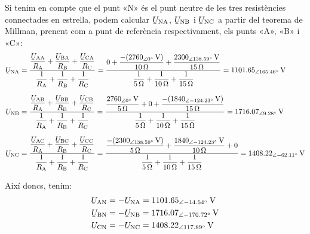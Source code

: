 \begin{exemple}
    Si tenim en compte que el punt «N» és el punt neutre de les tres resistències connectades en estrella, podem calcular $\cmplx{U}\ped{NA} $, $\cmplx{U}\ped{NB} $ i $\cmplx{U}\ped{NC}$ a partir del teorema de Millman, prenent com a punt de referència respectivament, els punts «A»,  «B»  i «C»:
    \begin{align*}
          \cmplx{U}\ped{NA} &= \frac{\dfrac{\cmplx{U}\ped{AA}}{R\ped{A}} + \dfrac{\cmplx{U}\ped{BA}}{R\ped{B}} + \dfrac{\cmplx{U}\ped{CA}}{R\ped{C}}}{\dfrac{1}{R\ped{A}} + \dfrac{1}{R\ped{B}} + \dfrac{1}{R\ped{C}}} = \frac{0 + \dfrac{-(\qtypd{2760}{0}{V})}{\qty{10}{\ohm}} + \dfrac{\qtypd{2300}{138,59}{V}}{\qty{15}{\ohm}}}{\dfrac{1}{\qty{5}{\ohm}} + \dfrac{1}{\qty{10}{\ohm}} + \dfrac{1}{\qty{15}{\ohm}}} = \qtypd{1101,65}{165,46}{V} \\[1.5ex]
          \cmplx{U}\ped{NB} &= \frac{\dfrac{\cmplx{U}\ped{AB}}{R\ped{A}} + \dfrac{\cmplx{U}\ped{BB}}{R\ped{B}} + \dfrac{\cmplx{U}\ped{CB}}{R\ped{C}}}{\dfrac{1}{R\ped{A}} + \dfrac{1}{R\ped{B}} + \dfrac{1}{R\ped{C}}} = \frac{\dfrac{\qtypd{2760}{0}{V}}{\qty{5}{\ohm}} + 0 + \dfrac{-(\qtypd{1840}{-124,23}{V})}{\qty{15}{\ohm}}}{\dfrac{1}{\qty{5}{\ohm}} + \dfrac{1}{\qty{10}{\ohm}} + \dfrac{1}{\qty{15}{\ohm}}} = \qtypd{1716,07}{9,28}{V} \\[1.5ex]
          \cmplx{U}\ped{NC} &= \frac{\dfrac{\cmplx{U}\ped{AC}}{R\ped{A}} + \dfrac{\cmplx{U}\ped{BC}}{R\ped{B}} + \dfrac{\cmplx{U}\ped{CC}}{R\ped{C}}}{\dfrac{1}{R\ped{A}} + \dfrac{1}{R\ped{B}} + \dfrac{1}{R\ped{C}}} = \frac{\dfrac{-(\qtypd{2300}{138,59}{V})}{\qty{5}{\ohm}} + \dfrac{\qtypd{1840}{-124,23}{V}}{\qty{10}{\ohm}} + 0}{\dfrac{1}{\qty{5}{\ohm}} + \dfrac{1}{\qty{10}{\ohm}} + \dfrac{1}{\qty{15}{\ohm}}} = \qtypd{1408,22}{-62.11}{V}
    \end{align*}

    Així doncs, tenim:
    \begin{align*}
        \cmplx{U}\ped{AN} &= -\cmplx{U}\ped{NA} =  \qtypd{1101,65}{-14,54}{V} \\
        \cmplx{U}\ped{BN} &= -\cmplx{U}\ped{NB} =  \qtypd{1716,07}{-170,72}{V} \\
        \cmplx{U}\ped{CN} &= -\cmplx{U}\ped{NC} =  \qtypd{1408,22}{117,89}{V}
    \end{align*}


\end{exemple}
